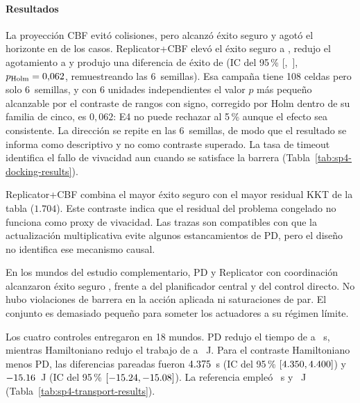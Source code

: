 \paragraph{Resultados}

La proyección CBF evitó colisiones, pero alcanzó éxito seguro \SPFourCBFSafe{} y agotó el horizonte en \SPFourCBFTimeout{} de los casos. Replicator+CBF elevó el éxito seguro a \SPFourRepSafe{}, redujo el agotamiento a \SPFourRepTimeout{} y produjo una diferencia de éxito de \SPFourDockEffect{} (IC del 95\,\% [\SPFourDockCILow{},~\SPFourDockCIHigh{}], $p_{\mathrm{Holm}}=0{,}062$, remuestreando las 6~semillas). Esa campaña tiene 108 celdas pero solo 6~semillas, y con 6 unidades independientes el valor $p$ más pequeño alcanzable por el contraste de rangos con signo, corregido por Holm dentro de su familia de cinco, es $0{,}062$: E4 no puede rechazar al 5\,\% aunque el efecto sea consistente. La dirección se repite en las 6~semillas, de modo que el resultado se informa como descriptivo y no como contraste superado. La tasa de timeout identifica el fallo de vivacidad aun cuando se satisface la barrera (Tabla~\ref{tab:sp4-docking-results}).

\begin{table}[!htbp]
  \centering
  \caption{Resultados pareados del experimento principal de acoplamiento dinámico.}
  \label{tab:sp4-docking-results}
  \resizebox{\textwidth}{!}{}
  \viuownsource
\end{table}
Replicator+CBF combina el mayor éxito seguro con el mayor residual KKT de la tabla ($1.704$). Este contraste indica que el residual del problema congelado no funciona como proxy de vivacidad. Las trazas son compatibles con que la actualización multiplicativa evite algunos estancamientos de PD, pero el diseño no identifica ese mecanismo causal.


En los \SPFourVFourWorlds{} mundos del estudio complementario, PD y Replicator con coordinación alcanzaron éxito seguro \SPFourVFourGameSafe{}, frente a \SPFourVFourCentralSafe{} del planificador central y \SPFourVFourDirectSafe{} del control directo. No hubo violaciones de barrera en la acción aplicada ni saturaciones de par. El conjunto es demasiado pequeño para someter los actuadores a su régimen límite.

Los cuatro controles entregaron en 18 mundos. PD redujo el tiempo de \SPFourHamiltonianTime{} a \SPFourPoseTime{}~s, mientras Hamiltoniano redujo el trabajo de \SPFourPoseWork{} a \SPFourHamiltonianWork{}~J. Para el contraste Hamiltoniano menos PD, las diferencias pareadas fueron $4.375{}$~s (IC del 95\,\% $[4.350{},4.400{}]$) y $-15.16{}$~J (IC del 95\,\% $[-15.24{},-15.08{}]$). La referencia empleó \SPFourCentralTime{}~s y \SPFourCentralWork{}~J (Tabla~\ref{tab:sp4-transport-results}).


